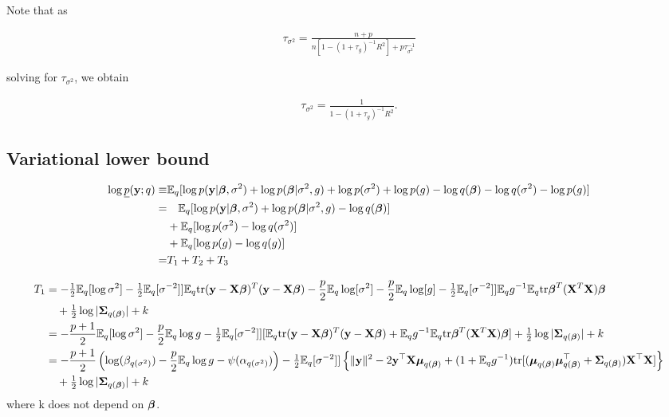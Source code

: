\documentclass{amsart}[12pt]
\begin{document}
Note that as

\begin{align*}
\tau_{\sigma^2} = \frac{n + p}{n[1 - (1 + \tau_g)^{-1} R^2] + p \tau_{\sigma^2}^{-1}}
\end{align*}

solving for $\tau_{\sigma^2}$, we obtain

\begin{align*}
\tau_{\sigma^2} = \frac{1}{1 - (1 + \tau_g)^{-1} R^2}.
\end{align*}

\subsection{Variational lower bound}

\begin{align*}
\log \underline{p}({\bf y}; q) \equiv& \mathbb{E}_q [\log p({\bf y} | {\boldsymbol \beta}, \sigma^2) + \log p({\boldsymbol \beta} | \sigma^2, g)
																					+ \log p(\sigma^2) + \log p(g) - \log q({\boldsymbol \beta})
																					- \log q(\sigma^2) - \log p(g)] \\
=& \quad \mathbb{E}_q [\log p({\bf y}| {\boldsymbol \beta}, \sigma^2) + \log p({\boldsymbol \beta} | \sigma^2, g) - \log q({\boldsymbol \beta})] \\
	&+ \mathbb{E}_q [\log p(\sigma^2) - \log q(\sigma^2)] \\
	&+ \mathbb{E}_q [\log p(g) - \log q(g)] \\
=& T_1 + T_2 + T_3
\end{align*}

\begin{align*}
T_1 &= -\tfrac{1}{2} \mathbb{E}_q [\log \sigma^2] -\tfrac{1}{2} \mathbb{E}_q [\sigma^{-2}]] \mathbb{E}_q \text{tr} ({\bf y} - {\bf X} {\boldsymbol \beta})^T ({\bf y} - {\bf X} {\boldsymbol \beta})
- \frac{p}{2} \mathbb{E}_q \log [\sigma^2] - \frac{p}{2} \mathbb{E}_q \log [g] - \tfrac{1}{2} \mathbb{E}_q [\sigma^{-2}]] \mathbb{E}_q g^{-1} \mathbb{E}_q \text{tr} {\boldsymbol\beta}^T ({\bf X}^T {\bf X}) {\boldsymbol \beta} \\
& \quad + \tfrac{1}{2} \log |{\boldsymbol \Sigma}_{q({\boldsymbol \beta})}| + k \\
&= -\frac{p + 1}{2} \mathbb{E}_q [\log \sigma^2] - \frac{p}{2} \mathbb{E}_q \log g
-\tfrac{1}{2} \mathbb{E}_q [\sigma^{-2}]] [\mathbb{E}_q \text{tr} ({\bf y} - {\bf X} {\boldsymbol \beta})^T ({\bf y} - {\bf X} {\boldsymbol \beta}) + \mathbb{E}_q g^{-1} \mathbb{E}_q \text{tr} {\boldsymbol\beta}^T ({\bf X}^T {\bf X}) {\boldsymbol \beta}]
+ \tfrac{1}{2} \log |{\boldsymbol \Sigma}_{q({\boldsymbol \beta})}| + k \\
&= -\frac{p + 1}{2} \left (\log (\beta_{q(\sigma^2)}) - \frac{p}{2} \mathbb{E}_q \log g - \psi(\alpha_{q(\sigma^2)}) \right )
- \tfrac{1}{2} \mathbb{E}_q [\sigma^{-2}]] \left \{ \| {\bf y}\|^2 - 2 {\bf y}^\top {\bf X} {\boldsymbol\mu}_{q({\boldsymbol \beta})} + (1 + \mathbb{E}_q g^{-1}) \text{tr}[({\boldsymbol \mu}_{q({\boldsymbol \beta})} {\boldsymbol \mu}_{q({\boldsymbol \beta})}^\top + {\boldsymbol \Sigma}_{q({\boldsymbol \beta})}) {\bf X}^\top {\bf X}] \right \}  \\
& \quad + \tfrac{1}{2} \log |{\boldsymbol \Sigma}_{q({\boldsymbol \beta})}| + k
\end{align*}
where k does not depend on ${\boldsymbol \beta}$.
\end{document}

